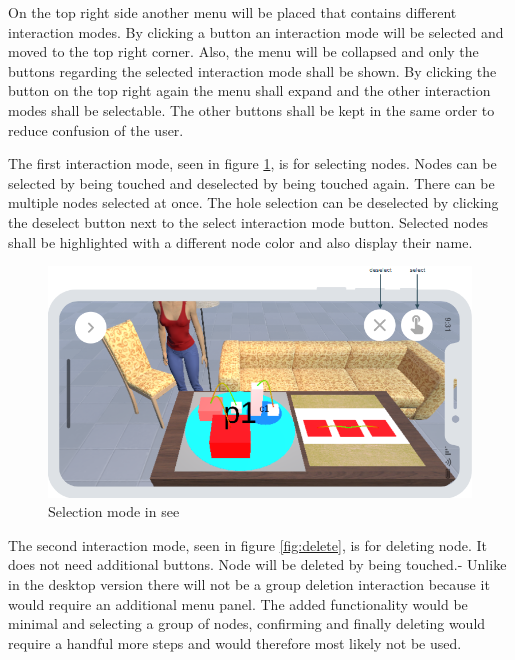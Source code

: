 On the top right side another menu will be placed that contains different interaction modes.
By clicking a button an interaction mode will be selected and moved to the top right corner.
Also, the menu will be collapsed and only the buttons regarding the selected interaction mode shall be shown.
By clicking the button on the top right again the menu shall expand and the other interaction modes shall be selectable.
The other buttons shall be kept in the same order to reduce confusion of the user.

The first interaction mode, seen in figure \ref{fig:select}, is for selecting nodes.
Nodes can be selected by being touched and deselected by being touched again.
There can be multiple nodes selected at once.
The hole selection can be deselected by clicking the deselect button next to the select interaction mode button.
Selected nodes shall be highlighted with a different node color and also display their name.

\begin{figure}[htb]
    \centering
    \includegraphics[width=1\textwidth]{Concept/img/menu1.png}
    \caption{Selection mode in \gls{see}}\label{fig:select}
\end{figure}

The second interaction mode, seen in figure \ref{fig:delete}, is for deleting node.
It does not need additional buttons.
Node will be deleted by being touched.-
Unlike in the desktop version there will not be a group deletion interaction because it would require an additional menu panel.
The added functionality would be minimal and selecting a group of nodes, confirming and finally deleting would require a handful more steps and would therefore most likely not be used.

